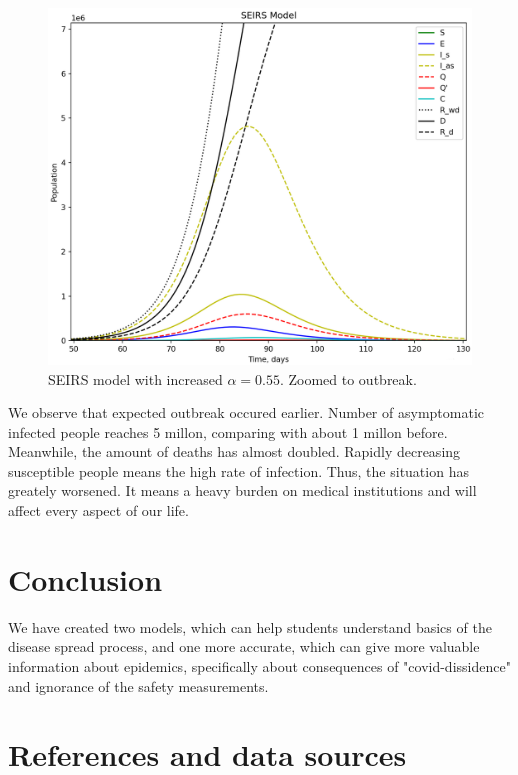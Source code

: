 \documentclass[12pt, a4paper]{article}
\begin{document}
	\newpage

	\begin{figure}[h!]
		\centering
		\includegraphics[width=12cm]{seirs_bigalpha_2.png}
		\caption{SEIRS model with increased $\alpha = 0.55$. Zoomed to outbreak.}
	\end{figure}

	We observe that expected outbreak occured earlier. Number of asymptomatic infected people reaches 5 millon, comparing with about 1 millon before. Meanwhile, the amount of deaths has almost doubled. Rapidly decreasing susceptible people means the high rate of infection. Thus, the situation has greately worsened. It means a heavy burden on medical institutions and will affect every aspect of our life.

	\section{Conclusion}

	We have created two models, which can help students understand basics of the disease spread process, and one more accurate, which can give more valuable information about epidemics, specifically about consequences of "covid-dissidence" and ignorance of the safety measurements.

	\section{References and data sources}
\end{document}

